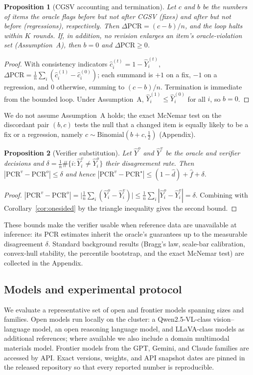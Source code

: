 \documentclass[pdflatex,sn-nature]{sn-jnl}
\newtheorem{proposition}{Proposition}
\begin{document}
\begin{proposition}[CGSV accounting and termination]\label{prop:cgsv}
Let $c$ and $b$ be the numbers of items the oracle flags before but not after CGSV
(fixes) and after but not before (regressions), respectively. Then
$\Delta\mathrm{PCR}=(c-b)/n$, and the loop halts within $K$ rounds. If, in addition,
no revision enlarges an item's oracle-violation set (Assumption~A), then $b=0$ and
$\Delta\mathrm{PCR}\ge0$.
\end{proposition}
\begin{proof}
With consistency indicators $\hat c_i^{(t)}=1-\hat Y_i^{(t)}$,
$\Delta\mathrm{PCR}=\frac1n\sum_i(\hat c_i^{(1)}-\hat c_i^{(0)})$; each summand is $+1$
on a fix, $-1$ on a regression, and $0$ otherwise, summing to $(c-b)/n$. Termination is
immediate from the bounded loop. Under Assumption~A, $\hat Y_i^{(1)}\le\hat Y_i^{(0)}$
for all $i$, so $b=0$.
\end{proof}

\noindent We do not assume Assumption~A holds; the exact McNemar test on the discordant
pair $(b,c)$ tests the null that a changed item is equally likely to be a fix or a
regression, namely $c\sim\mathrm{Binomial}(b+c,\tfrac12)$ (Appendix).

\begin{proposition}[Verifier substitution]\label{prop:verifier}
Let $\hat Y^o$ and $\hat Y^v$ be the oracle and verifier decisions and
$\delta=\frac1n\#\{i:\hat Y^v_i\neq\hat Y^o_i\}$ their disagreement rate. Then
$|\mathrm{PCR}^v-\mathrm{PCR}^o|\le\delta$ and hence
$|\mathrm{PCR}^v-\mathrm{PCR}^\star|\le(1-\hat d)+\hat f+\delta$.
\end{proposition}
\begin{proof}
$|\mathrm{PCR}^v-\mathrm{PCR}^o|=\big|\frac1n\sum_i(\hat Y^o_i-\hat Y^v_i)\big|
\le\frac1n\sum_i|\hat Y^o_i-\hat Y^v_i|=\delta$. Combining with
Corollary~\ref{cor:onesided} by the triangle inequality gives the second bound.
\end{proof}

\noindent These bounds make the verifier usable when reference data are unavailable at
inference: its PCR estimates inherit the oracle's guarantees up to the measurable
disagreement $\delta$. Standard background results (Bragg's law, scale-bar calibration,
convex-hull stability, the percentile bootstrap, and the exact McNemar test) are
collected in the Appendix.

\subsection*{Models and experimental protocol}
We evaluate a representative set of open and frontier models spanning sizes and
families. Open models run locally on the cluster: a Qwen2.5-VL-class vision--language
model,\cite{qwen25vl} an open reasoning language model, and LLaVA-class models as
additional references;\cite{liu2024llava} where available we also include a domain
multimodal materials model.\cite{matterchat2026} Frontier models from the GPT,
Gemini, and Claude families are accessed by API. Exact versions, weights, and API
snapshot dates are pinned in the released repository so that every reported number is
reproducible.
\end{document}

